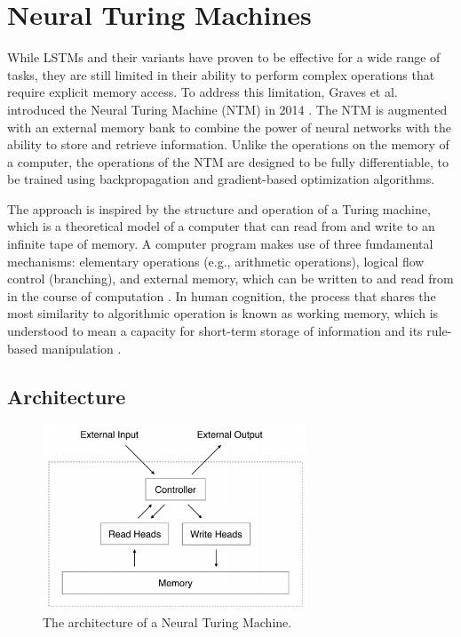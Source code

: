 \documentclass{article}
\begin{document}
\section{Neural Turing Machines}
\label{ch:4}

While LSTMs and their variants have proven to be effective for a wide range of tasks, they
are still limited in their ability to perform complex operations that require explicit
memory access. To address this limitation, Graves et al. introduced the Neural Turing
Machine (NTM) in 2014 \cite{gravesNeuralTuringMachines2014}. The NTM is augmented with an
external memory bank to combine the power of neural networks with the ability to store and
retrieve information. Unlike the operations on the memory of a computer, the operations of
the NTM are designed to be fully differentiable, to be trained using backpropagation and
gradient-based optimization algorithms.

The approach is inspired by the structure and operation of a Turing machine, which is a
theoretical model of a computer that can read from and write to an infinite tape of
memory. A computer program makes use of three fundamental mechanisms: elementary
operations (e.g., arithmetic operations), logical flow control (branching), and external
memory, which can be written to and read from in the course of computation
\cite{von_neumann_first_1945}. In human cognition, the process that shares the most
similarity to algorithmic operation is known as working memory, which is understood to
mean a capacity for short-term storage of information and its rule-based manipulation
\cite{baddeley_memory_2009}.



\subsection{Architecture}
\label{sec:4.0}

\begin{figure}[htbp]
  \centering
  \includegraphics[width=0.7\textwidth]{NTM Structure.png}
  \caption{The architecture of a Neural Turing Machine.}
  \label{fig:ntm-structure}
\end{figure}
\end{document}
